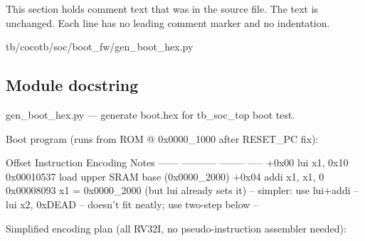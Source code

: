 This section holds comment text that was in the source file. The text is unchanged. Each line has no leading comment marker and no indentation.

\begin{relocated}{tb/cocotb/soc/boot_fw/gen_boot_hex.py}

\subsection*{Module docstring}

\begin{textblock}
gen_boot_hex.py — generate boot.hex for tb_soc_top boot test.

Boot program (runs from ROM @ 0x0000_1000 after RESET_PC fix):

Offset  Instruction          Encoding              Notes
------  -----------          --------              -----
+0x00   lui  x1, 0x10       0x00010537  load upper SRAM base (0x0000_2000)
+0x04   addi x1, x1, 0      0x00008093  x1 = 0x0000_2000  (but lui already sets it)
-- simpler: use lui+addi --
lui  x2, 0xDEAD     -- doesn't fit neatly; use two-step below --

Simplified encoding plan (all RV32I, no pseudo-instruction assembler needed):


\end{textblock}
\end{relocated}
